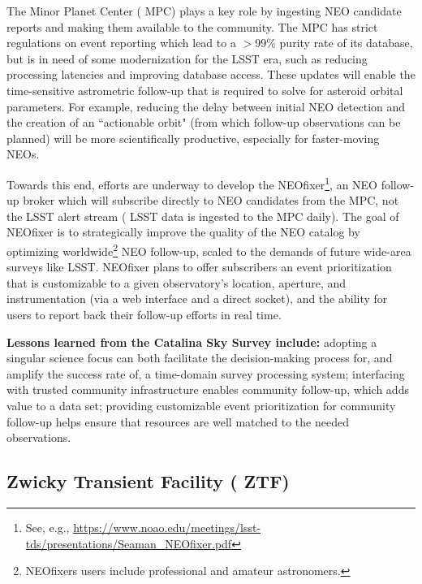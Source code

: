 The Minor Planet  {Center} ( {MPC}) plays a key role by ingesting  {NEO} candidate reports and making them available to the community.
The  {MPC} has strict regulations on event reporting which lead to a $>$99\% purity rate of its database, but is in need of some modernization for the  {LSST} era, such as reducing processing latencies and improving database access.
These updates will enable the time-sensitive astrometric follow-up that is required to solve for asteroid orbital parameters.
For example, reducing the delay between initial  {NEO} detection and the creation of an ``actionable orbit" (from which follow-up observations can be planned) will be more scientifically productive, especially for faster-moving NEOs.

Towards this end, efforts are underway to develop the NEOfixer\footnote{See, e.g., \url{https://www.noao.edu/meetings/lsst-tds/presentations/Seaman_NEOfixer.pdf}}, an  {NEO} follow-up broker which will subscribe directly to  {NEO} candidates from the  {MPC}, not the  {LSST} alert stream ( {LSST} data is ingested to the  {MPC} daily).
The goal of NEOfixer is to strategically improve the quality of the  {NEO} catalog by optimizing worldwide\footnote{NEOfixers users include professional and amateur astronomers.}  {NEO} follow-up, scaled to the demands of future wide-area surveys like  {LSST}.
NEOfixer plans to offer subscribers an event prioritization that is customizable to a given observatory's location, aperture, and instrumentation (via a web interface and a direct socket), and the ability for users to report back their follow-up efforts in real time.

{\bf Lessons learned from the Catalina Sky Survey include:}
adopting a singular science focus can both facilitate the decision-making process for, and amplify the success rate of, a time-domain survey processing system;
interfacing with trusted community infrastructure enables community follow-up, which adds value to a data set;
providing customizable event prioritization for community follow-up helps ensure that resources are well matched to the needed observations.


\subsection{Zwicky Transient Facility ( {ZTF})}

